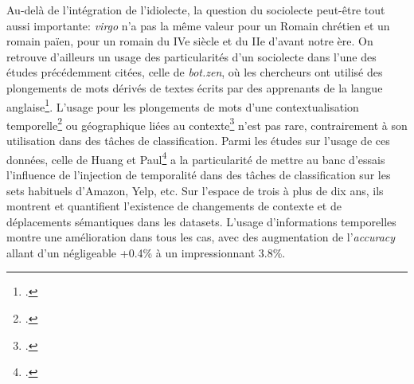 Au-delà de l'intégration de l'idiolecte, la question du sociolecte peut-être tout aussi importante: \textit{virgo} n'a pas la même valeur pour un Romain chrétien et un romain païen, pour un romain du IVe siècle et du IIe d'avant notre ère. On retrouve d'ailleurs un usage des particularités d'un sociolecte dans l'une des études précédemment citées, celle de \textit{bot.zen}, où les chercheurs ont utilisé des plongements de mots dérivés de textes écrits par des apprenants de la langue anglaise\footcite{stemle_using_2018}. L'usage pour les plongements de mots d'une contextualisation temporelle\footcite{carlo_training_2019} ou géographique liées au contexte\footcite{gong_enriching_2020} n'est pas rare, contrairement à son utilisation dans des tâches de classification. Parmi les études sur l'usage de ces données, celle de Huang et Paul\footcite{huang_neural_2019} a la particularité de mettre au banc d'essais l'influence de l'injection de temporalité dans des tâches de classification sur les sets habituels d'Amazon, Yelp, etc. Sur l'espace de trois à plus de dix ans, ils montrent et quantifient l'existence de changements de contexte et de déplacements sémantiques dans les datasets. L'usage d'informations temporelles montre une amélioration dans tous les cas, avec des augmentation de l'\textit{accuracy} allant d'un négligeable +0.4\% à un impressionnant 3.8\%.

